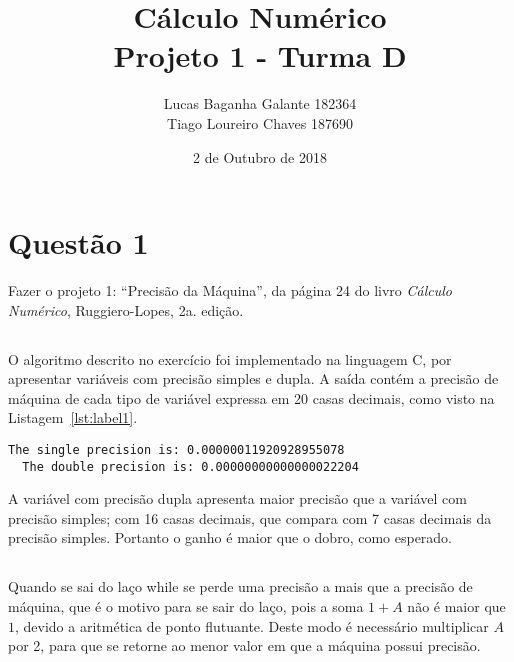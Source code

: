 \documentclass[12pt,a4paper,final]{article}
\author{Lucas Baganha Galante 182364\\Tiago Loureiro Chaves 187690}
\title{Cálculo Numérico \\ Projeto 1 - Turma D}
\date{2 de Outubro de 2018}
\begin{document}
\onehalfspace %

\maketitle


\section{Questão 1}
Fazer o projeto 1: ``Precisão da Máquina'',
da página 24 do livro \textit{Cálculo Numérico}, Ruggiero-Lopes, 2a. edição.

\subsection{}

O algoritmo descrito no exercício foi implementado na linguagem C, por apresentar
variáveis com precisão simples e dupla. A saída contém a precisão de máquina de
cada tipo de variável expressa em 20 casas decimais, como visto na Listagem~\ref{lst:label1}.

\begin{lstlisting}[caption= \textbf{Precisão de máquina para variáveis simples e duplas.},label={lst:label1}]
  The single precision is: 0.00000011920928955078
  The double precision is: 0.00000000000000022204
\end{lstlisting}

A variável com precisão dupla apresenta maior precisão que a variável com precisão
simples; com 16 casas decimais, que compara com 7 casas decimais da precisão simples. Portanto o ganho
é maior que o dobro, como esperado.

\subsection{}

Quando se sai do laço while se perde uma precisão a mais que a precisão de máquina, que é o
motivo para se sair do laço, pois a soma $1+A$ não é maior que $1$, devido a aritmética de ponto
flutuante. Deste modo é necessário multiplicar $A$ por 2, para que se retorne ao menor valor em que
a máquina possui precisão.

\subsection{}
\end{document}
